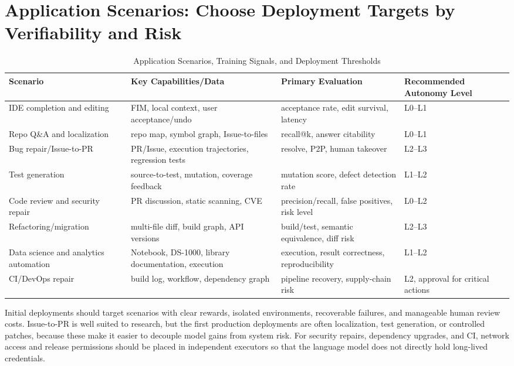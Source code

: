 \documentclass[10pt,a4paper,UTF8,fontset=none]{ctexart}
\begin{document}
\section{Application Scenarios: Choose Deployment Targets by Verifiability and Risk}

\begin{table}[htbp]
\centering
\caption{Application Scenarios, Training Signals, and Deployment Thresholds}
\label{en:tab:applications}
\small
\begin{tabularx}{\textwidth}{p{3.0cm}YYY}
\toprule
Scenario & Key Capabilities/Data & Primary Evaluation & Recommended Autonomy Level \\
\midrule
IDE completion and editing & FIM, local context, user acceptance/undo & acceptance rate, edit survival, latency & L0--L1 \\
Repo Q\&A and localization & repo map, symbol graph, Issue-to-files & recall@k, answer citability & L0--L1 \\
Bug repair/Issue-to-PR & PR/Issue, execution trajectories, regression tests & resolve, P2P, human takeover & L2--L3 \\
Test generation & source-to-test, mutation, coverage feedback & mutation score, defect detection rate & L1--L2 \\
Code review and security repair & PR discussion, static scanning, CVE & precision/recall, false positives, risk level & L0--L2 \\
Refactoring/migration & multi-file diff, build graph, API versions & build/test, semantic equivalence, diff risk & L2--L3 \\
Data science and analytics automation & Notebook, DS-1000, library documentation, execution & execution, result correctness, reproducibility & L1--L2 \\
CI/DevOps repair & build log, workflow, dependency graph & pipeline recovery, supply-chain risk & L2, approval for critical actions \\
\bottomrule
\end{tabularx}
\end{table}

Initial deployments should target scenarios with clear rewards, isolated environments, recoverable failures, and manageable human review costs. Issue-to-PR is well suited to research, but the first production deployments are often localization, test generation, or controlled patches, because these make it easier to decouple model gains from system risk. For security repairs, dependency upgrades, and CI, network access and release permissions should be placed in independent executors so that the language model does not directly hold long-lived credentials.
\end{document}
